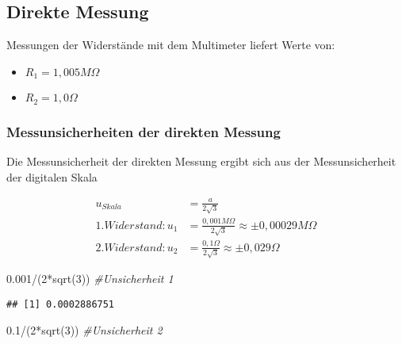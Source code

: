 \documentclass[
  9pt,
]{article}
\newenvironment{Shaded}{\begin{snugshade}}{\end{snugshade}}
\newcommand{\CommentTok}[1]{\textcolor[rgb]{0.56,0.35,0.01}{\textit{#1}}}
\newcommand{\DecValTok}[1]{\textcolor[rgb]{0.00,0.00,0.81}{#1}}
\newcommand{\FloatTok}[1]{\textcolor[rgb]{0.00,0.00,0.81}{#1}}
\newcommand{\FunctionTok}[1]{\textcolor[rgb]{0.00,0.00,0.00}{#1}}
\newcommand{\NormalTok}[1]{#1}
\newcommand{\SpecialCharTok}[1]{\textcolor[rgb]{0.00,0.00,0.00}{#1}}
\begin{document}
\hypertarget{direkte-messung}{%
\subsection{Direkte Messung}\label{direkte-messung}}

Messungen der Widerstände mit dem Multimeter liefert Werte von:

\begin{itemize}
\item $R_1 = 1,005 M\Omega$\\
\item $R_2 = 1,0 \Omega$
\end{itemize}

\hypertarget{messunsicherheiten-der-direkten-messung}{%
\subsubsection{Messunsicherheiten der direkten
Messung}\label{messunsicherheiten-der-direkten-messung}}

Die Messunsicherheit der direkten Messung ergibt sich aus der
Messunsicherheit der digitalen Skala

\begin{equation*}
\begin{split}
u_{Skala} &=\frac{a}{2\sqrt{3}} \\
1.Widerstand: u_1 &= \frac{0,001M\Omega}{2\sqrt{3}} \approx \pm 0,00029 M\Omega \\
2.Widerstand: u_2 &= \frac{0,1\Omega}{2\sqrt{3}} \approx \pm 0,029\Omega 
\end{split}
\end{equation*}

\begin{Shaded}
\begin{Highlighting}[]
\FloatTok{0.001}\SpecialCharTok{/}\NormalTok{(}\DecValTok{2}\SpecialCharTok{*}\FunctionTok{sqrt}\NormalTok{(}\DecValTok{3}\NormalTok{)) }\CommentTok{\#Unsicherheit 1}
\end{Highlighting}
\end{Shaded}

\begin{verbatim}
## [1] 0.0002886751
\end{verbatim}

\begin{Shaded}
\begin{Highlighting}[]
\FloatTok{0.1}\SpecialCharTok{/}\NormalTok{(}\DecValTok{2}\SpecialCharTok{*}\FunctionTok{sqrt}\NormalTok{(}\DecValTok{3}\NormalTok{)) }\CommentTok{\#Unsicherheit 2}
\end{Highlighting}
\end{Shaded}
\end{document}
